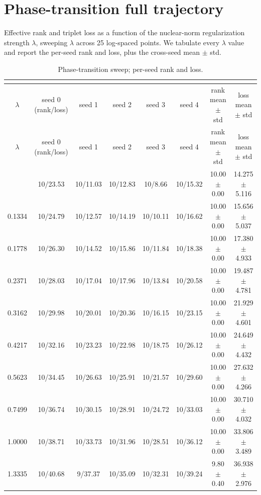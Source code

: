 \section{Phase-transition full trajectory}
\label{app:phase}

Effective rank and triplet loss as a function of the nuclear-norm regularization strength $\lambda$, sweeping $\lambda$ across 25 log-spaced points. We tabulate every $\lambda$ value and report the per-seed rank and loss, plus the cross-seed mean $\pm$ std.

\begin{longtable}{c c c c c c c c}
\caption{Phase-transition sweep; per-seed rank and loss.}\\
\label{tab:phase-traj}\\
\toprule
$\lambda$ & seed 0 (rank/loss) & seed 1 & seed 2 & seed 3 & seed 4 & rank mean $\pm$ std & loss mean $\pm$ std \\
\midrule
\endfirsthead
\toprule
$\lambda$ & seed 0 (rank/loss) & seed 1 & seed 2 & seed 3 & seed 4 & rank mean $\pm$ std & loss mean $\pm$ std \\
\midrule
\endhead
\bottomrule
\endfoot
0.1000 & 10/23.53 & 10/11.03 & 10/12.83 & 10/8.66 & 10/15.32 & 10.00 $\pm$ 0.00 & 14.275 $\pm$ 5.116 \\
0.1334 & 10/24.79 & 10/12.57 & 10/14.19 & 10/10.11 & 10/16.62 & 10.00 $\pm$ 0.00 & 15.656 $\pm$ 5.037 \\
0.1778 & 10/26.30 & 10/14.52 & 10/15.86 & 10/11.84 & 10/18.38 & 10.00 $\pm$ 0.00 & 17.380 $\pm$ 4.933 \\
0.2371 & 10/28.03 & 10/17.04 & 10/17.96 & 10/13.84 & 10/20.58 & 10.00 $\pm$ 0.00 & 19.487 $\pm$ 4.781 \\
0.3162 & 10/29.98 & 10/20.01 & 10/20.36 & 10/16.15 & 10/23.15 & 10.00 $\pm$ 0.00 & 21.929 $\pm$ 4.601 \\
0.4217 & 10/32.16 & 10/23.23 & 10/22.98 & 10/18.75 & 10/26.12 & 10.00 $\pm$ 0.00 & 24.649 $\pm$ 4.432 \\
0.5623 & 10/34.45 & 10/26.63 & 10/25.91 & 10/21.57 & 10/29.60 & 10.00 $\pm$ 0.00 & 27.632 $\pm$ 4.266 \\
0.7499 & 10/36.74 & 10/30.15 & 10/28.91 & 10/24.72 & 10/33.03 & 10.00 $\pm$ 0.00 & 30.710 $\pm$ 4.032 \\
1.0000 & 10/38.71 & 10/33.73 & 10/31.96 & 10/28.51 & 10/36.12 & 10.00 $\pm$ 0.00 & 33.806 $\pm$ 3.489 \\
1.3335 & 10/40.68 & 9/37.37 & 10/35.09 & 10/32.31 & 10/39.24 & 9.80 $\pm$ 0.40 & 36.938 $\pm$ 2.976 \\

\end{longtable}
